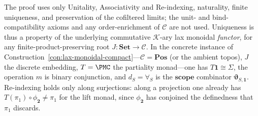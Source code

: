 \begin{remark}
The proof uses only Unitality, Associativity and Re-indexing, naturality, finite uniqueness, and preservation of the cofiltered limits; the unit- and bind-compatibility axioms and any order-enrichment of $\mathcal{C}$ are not used. Uniqueness is thus a property of the underlying commutative $\mathcal{K}$-ary lax monoidal \emph{functor}, for any finite-product-preserving root $J\colon\mathbf{Set}\to\mathcal{C}$. In the concrete instance of Construction~\ref{con:lax-monoidal-compact}---$\mathcal{C}=\mathbf{Pos}$ (or the ambient topos), $J$ the discrete embedding, $T=\PMC$ the partiality monad---one has $T\mathbf 1\cong\Sigma$, the operation $m$ is binary conjunction, and $d_S=\forall_S$ is the $\mathbf{scope}$ combinator $\boldsymbol{\vartheta}_{S,\mathbf 1}$. Re-indexing holds only along surjections: along a projection one already has $T(\pi_1)\circ\phi_{\mathbf 2}\neq\pi_1$ for the lift monad, since $\phi_{\mathbf 2}$ has conjoined the definedness that $\pi_1$ discards.
\end{remark}
